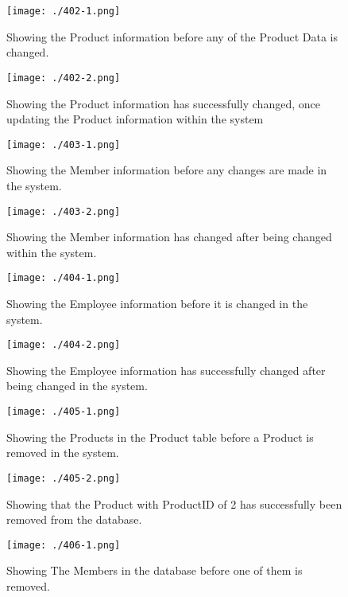 \begin{figure}[H]
    \texttt{[image: ./402-1.png]}
    \caption{Showing the Product information before any of the Product Data is changed.} \label{fig:402-1}
\end{figure}

\begin{figure}[H]
    \texttt{[image: ./402-2.png]}
    \caption{Showing the Product information has successfully changed, once updating the Product information within the system} \label{fig:402-2}
\end{figure}

\begin{figure}[H]
    \texttt{[image: ./403-1.png]}
    \caption{Showing the Member information before any changes are made in the system.} \label{fig:403-1}
\end{figure}

\begin{figure}[H]
    \texttt{[image: ./403-2.png]}
    \caption{Showing the Member information has changed after being changed within the system.} \label{fig:403-2}
\end{figure}

\begin{figure}[H]
    \texttt{[image: ./404-1.png]}
    \caption{Showing the Employee information before it is changed in the system.} \label{fig:404-1}
\end{figure}

\begin{figure}[H]
    \texttt{[image: ./404-2.png]}
    \caption{Showing the Employee information has successfully changed after being changed in the system.} \label{fig:404-2}
\end{figure}

\begin{figure}[H]
    \texttt{[image: ./405-1.png]}
    \caption{Showing the Products in the Product table before a Product is removed in the system.} \label{fig:405-1}
\end{figure}

\begin{figure}[H]
    \texttt{[image: ./405-2.png]}
    \caption{Showing that the Product with ProductID of 2 has successfully been removed from the database.} \label{fig:405-2}
\end{figure}

\begin{figure}[H]
    \texttt{[image: ./406-1.png]}
    \caption{Showing The Members in the database before one of them is removed.} \label{fig:406-1}
\end{figure}

